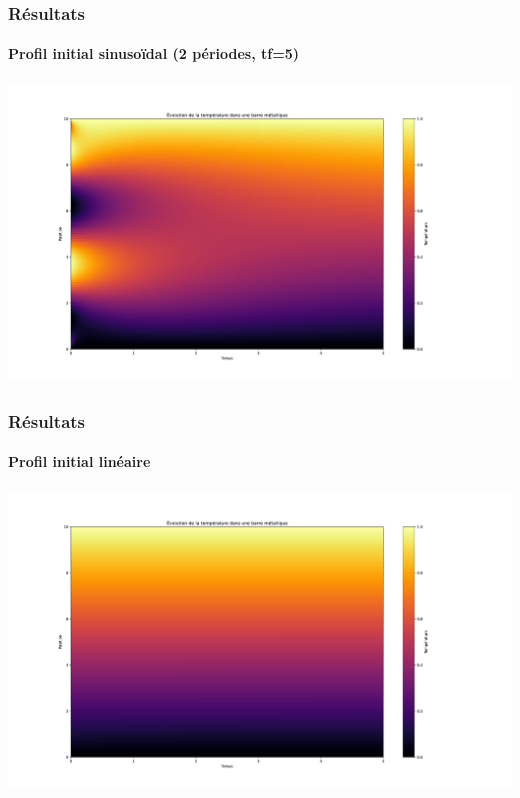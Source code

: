 \documentclass{beamer}
\begin{document}
    \begin{frame}
    \frametitle{Résultats}
    \framesubtitle{Profil initial sinusoïdal (2 périodes, tf=5)}

    \begin{center}
    \includegraphics[width=1.2\linewidth]{figs/Figure_3.pdf}
    \end{center}


    \end{frame}



    \begin{frame}
    \frametitle{Résultats}
    \framesubtitle{Profil initial linéaire}

    \begin{center}
    \includegraphics[width=1.2\linewidth]{figs/Figure_4.pdf}
    \end{center}


    \end{frame}
\end{document}
